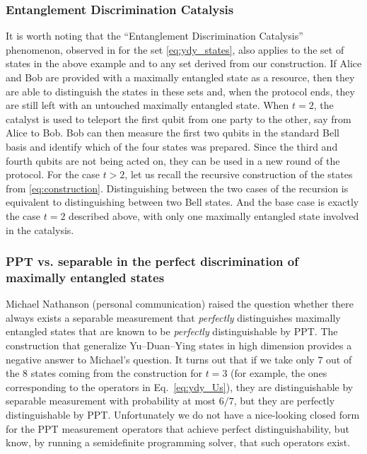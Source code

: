 \subsubsection*{Entanglement Discrimination Catalysis}
It is worth noting that the ``Entanglement Discrimination Catalysis'' 
phenomenon, observed in \cite{Yu12} for the set \eqref{eq:ydy_states}, 
also applies to the set 
of states in the above example and to any set derived 
from our construction.
If Alice and Bob are provided with a maximally entangled state
as a resource, then they are able to distinguish the states
in these sets and, when the protocol ends, 
they are still left with an untouched maximally entangled state.
When $t=2$, the catalyst is used to teleport 
the first qubit from one party to the other, 
say from Alice to Bob. 
Bob can then measure the first two qubits in the standard 
Bell basis and identify which of the four states was prepared. 
Since the third and fourth qubits are not being acted on, 
they can be used in a new round of the protocol.
For the case $t > 2$, let us recall the recursive construction 
of the states from \eqref{eq:construction}.
Distinguishing between the two cases of the recursion is 
equivalent to distinguishing between two Bell states.
And the base case is exactly the case $t=2$ described above, 
with only one maximally entangled state involved in the catalysis.


\subsubsection*{PPT vs. separable in the perfect discrimination of maximally entangled states}
Michael Nathanson (personal communication) raised the question whether there 
always exists a separable measurement that \emph{perfectly} distinguishes maximally entangled 
states that are known to be \emph{perfectly} distinguishable by PPT.
The construction that generalize Yu--Duan--Ying states in high dimension provides
a negative answer to Michael's question. It turns out that if we take only $7$ out of the $8$ states
coming from the construction for $t=3$ (for example, the ones corresponding to the operators in 
Eq.~\eqref{eq:ydy_Us}), they are distinguishable by separable measurement
with probability at most $6/7$, but they are perfectly distinguishable by PPT.
Unfortunately we do not have a nice-looking closed form for
the PPT measurement operators that achieve perfect distinguishability, 
but know, by running a semidefinite programming solver, that such operators exist.

